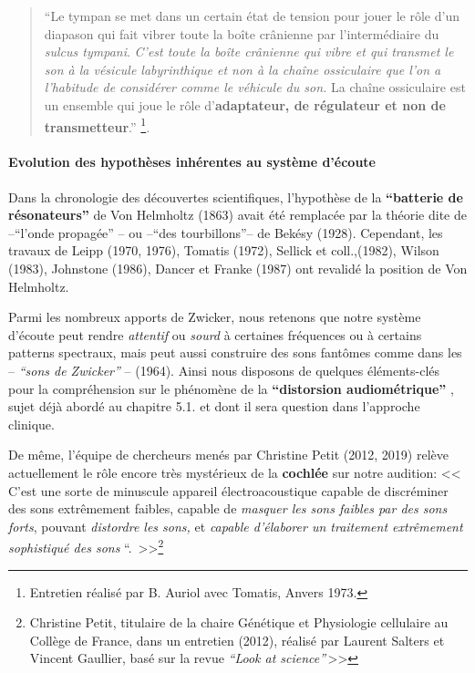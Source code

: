 \begin{quotation}
	``Le tympan se met dans un certain état de tension pour jouer le
	rôle d'un diapason qui fait vibrer toute la boîte crânienne
	par l'intermédiaire du \emph{sulcus tympani}. 
	\emph{C'est toute la boîte crânienne qui vibre et qui transmet le son à 
la vésicule labyrinthique et non à la chaîne ossiculaire que l'on a l'habitude 
de considérer comme le véhicule du son.} La chaîne ossiculaire est un ensemble 
qui
	joue le rôle d'\textbf{adaptateur, de régulateur et non de transmetteur}.'' 
	\footnote{Entretien réalisé par B. Auriol avec Tomatis, Anvers 
1973.}.
\end{quotation}


\paragraph{Evolution des hypothèses inhérentes au système d'écoute}



Dans la chronologie des découvertes scientifiques,  l'hypothèse de la \textbf{``batterie de
résonateurs''} de Von Helmholtz (1863)  avait été remplacée par la
théorie dite de  --``l'onde propagée'' -- ou --``des
tourbillons''-- de Bekésy (1928).
Cependant, les travaux de Leipp (1970, 1976), Tomatis (1972), Sellick et coll.,(1982), Wilson (1983),
  Johnstone (1986), Dancer et
  Franke (1987) ont revalidé la position de Von Helmholtz. \autocite[p 24---28,
  ch. 1]{auriol:cle}

  Parmi les nombreux apports de Zwicker, \autocite[p 84]{auriol:cle} nous retenons que notre système d'écoute peut rendre
\textit{attentif} ou\textit{ sourd} à certaines fréquences ou à certains patterns
spectraux, mais peut aussi construire des sons fantômes comme dans les -- \textit{``sons de Zwicker''} -- (1964).
Ainsi nous disposons de quelques éléments-clés pour la compréhension
sur le phénomène de la \textbf{``distorsion audiométrique''} \autocite[p
85]{auriol:cle}, sujet déjà abordé au chapitre 5.1.  et dont il sera question dans l'approche
clinique.



De même, l'équipe de chercheurs menés par Christine Petit (2012, 2019) relève
actuellement
 le rôle encore très mystérieux de la \textbf{cochlée} sur notre audition:
<<\,C'est une sorte de minuscule appareil électroacoustique capable
de discréminer des sons extrêmement faibles, capable de \emph{masquer
les sons faibles par des sons forts}, pouvant \emph{distordre les
sons,} et \emph{capable d'élaborer un traitement extrêmement
sophistiqué des sons} ``. \,>>\footnote{Christine Petit, titulaire de la chaire Génétique et
Physiologie cellulaire au Collège de France, dans un entretien (2012), 
réalisé par Laurent Salters et Vincent Gaullier, basé sur la revue
\textit{``Look at science''}\,>>}

